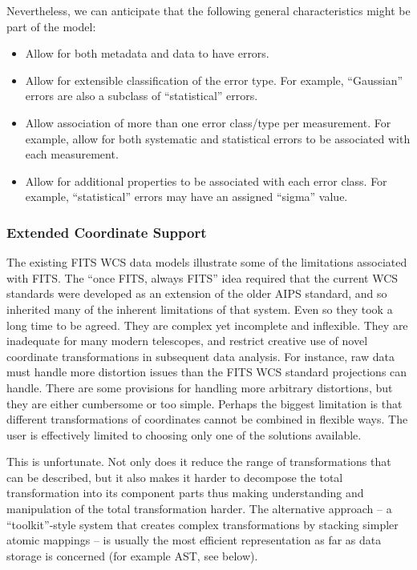 \documentclass[final,authoryear,5p,times,twocolumn]{elsarticle}
\begin{document}
{{Nevertheless, we can anticipate that the following general
characteristics might be part of the model:

\begin{itemize}
\item Allow for both metadata and data to have errors.

\item Allow for extensible classification of the error type. For example,
``Gaussian'' errors are also a subclass of ``statistical'' errors.

\item Allow association of more than one error class/type per
measurement. For example, allow for both systematic and statistical
errors to be associated with each measurement.

\item Allow for additional properties to be associated with each error
class. For example, ``statistical'' errors may have an assigned ``sigma''
value.
\end{itemize}

\subsubsection{Extended Coordinate Support}
\label{sec:wcs}


The existing FITS WCS data models illustrate some of the limitations
associated with FITS. The ``once FITS, always FITS'' idea required that
the current WCS standards were developed as an extension of the older
AIPS standard, and so inherited many of the inherent limitations of
that system. Even so they took a long time to be agreed. They are
complex yet incomplete and inflexible. They are inadequate for many
modern telescopes, and restrict creative use of novel coordinate
transformations in subsequent data analysis. For instance, raw data
must handle more distortion issues than the FITS WCS standard
projections can handle. There are some provisions for handling more
arbitrary distortions, but they are either cumbersome or too
simple. Perhaps the biggest limitation is that different
transformations of coordinates cannot be combined in flexible
ways. The user is effectively limited to choosing only one of the solutions
available.


This is unfortunate. Not only does it reduce the range of
transformations that can be described, but it also makes it harder to
decompose the total transformation into its component parts thus making
understanding and manipulation of the total transformation harder. The
alternative approach -- a ``toolkit''-style system that creates complex
transformations by stacking simpler atomic mappings -- is usually the
most efficient representation as far as data storage is concerned
(for example AST, see below).


}}
\end{document}
